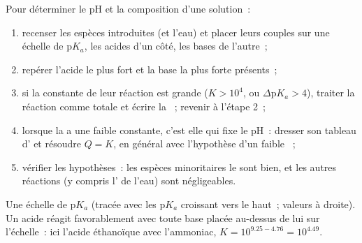 \begin{method}\label{met:b1:predominant-reaction:method}
Pour déterminer le pH et la composition d'une solution~:
\begin{enumerate}
  \item recenser les espèces introduites (et l'eau) et placer leurs
        couples sur une échelle de $\mathrm{p}K_a$, les acides d'un côté,
        les bases de l'autre~;
  \item repérer l'acide le plus fort et la base la plus forte présents~;
  \item si la constante de leur réaction est grande ($K > 10^4$, ou
        $\Delta\mathrm{p}K_a > 4$), traiter la réaction comme totale et
        écrire la ~; revenir à l'étape 2~;
  \item lorsque la  a une faible constante, c'est
        elle qui fixe le pH~: dresser son tableau d' et résoudre
        $Q = K$, en général avec l'hypothèse d'un faible ~;
  \item vérifier les hypothèses~: les espèces minoritaires le sont
        bien, et les autres réactions (y compris l' de
        l'eau) sont négligeables.
\end{enumerate}
\end{method}

\begin{omfigure}

{\small Une échelle de $\mathrm{p}K_a$ (tracée avec les p$K_a$
croissant vers le haut~; valeurs à droite). Un acide réagit
favorablement avec toute base placée au-dessus de lui sur l'échelle~:
ici l'acide éthanoïque avec l'ammoniac,
$K = 10^{9.25 - 4.76} = 10^{4.49}$.}
\end{omfigure}

